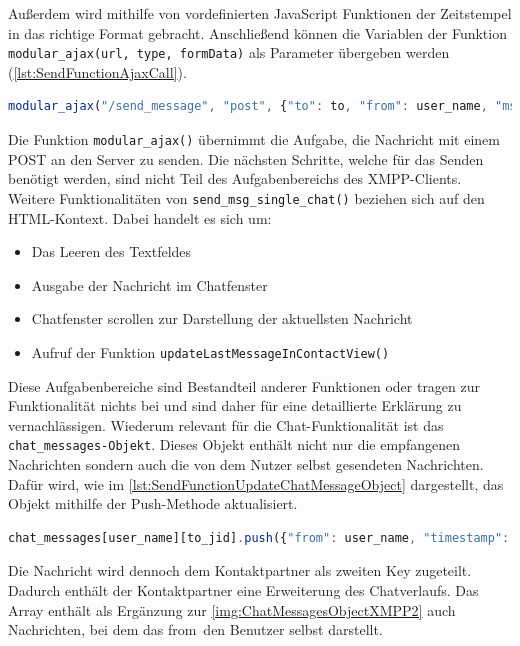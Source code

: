 \documentclass[a4paper,titlepage,halfparskip,12pt]{scrreprt}
\begin{document}
\begin{onehalfspacing}
Außerdem wird mithilfe von vordefinierten JavaScript Funktionen der Zeitstempel in das richtige Format gebracht. Anschließend können die Variablen der Funktion \texttt{modular\_ajax(url, type, formData)} als Parameter übergeben werden (\autoref{lst:SendFunctionAjaxCall}).
\begin{lstlisting}[language=Javascript,caption=Aufruf der Funktion \texttt{modular\_ajax(url, type, formData)} mit allen Parametern  ,label={lst:SendFunctionAjaxCall}]
modular_ajax("/send_message", "post", {"to": to, "from": user_name, "msg_subject": "", "msg_body": msg, "msg_type": "chat"});
\end{lstlisting}
Die Funktion \texttt{modular\_ajax()} übernimmt die Aufgabe, die Nachricht mit einem POST an den Server zu senden. Die nächsten Schritte, welche für das Senden benötigt werden, sind nicht Teil des Aufgabenbereichs des XMPP-Clients.
Weitere Funktionalitäten von \texttt{send\_msg\_single\_chat()} beziehen sich auf den \ac{HTML}-Kontext. Dabei handelt es sich um:
\begin{itemize}
	\item Das Leeren des Textfeldes
	\item Ausgabe der Nachricht im Chatfenster
	\item Chatfenster scrollen zur Darstellung der aktuellsten Nachricht
	\item Aufruf der Funktion \texttt{updateLastMessageInContactView()} 
\end{itemize}
Diese Aufgabenbereiche sind Bestandteil anderer Funktionen oder tragen zur Funktionalität nichts bei und sind daher für eine detaillierte Erklärung zu vernachlässigen. Wiederum relevant für die Chat-Funktionalität ist das \texttt{chat\_messages-Objekt}. Dieses Objekt enthält nicht nur die empfangenen Nachrichten sondern auch die von dem Nutzer selbst gesendeten Nachrichten. Dafür wird, wie im \autoref{lst:SendFunctionUpdateChatMessageObject} dargestellt, das Objekt mithilfe der Push-Methode aktualisiert.
\begin{lstlisting}[language=Javascript,caption=Nachricht in Dictionary einfügen  ,label={lst:SendFunctionUpdateChatMessageObject}]
chat_messages[user_name][to_jid].push({"from": user_name, "timestamp": msg_timestamp, "txt": msg, "type": "chat"});
\end{lstlisting}
Die Nachricht wird dennoch dem Kontaktpartner als zweiten Key zugeteilt. Dadurch enthält der Kontaktpartner eine Erweiterung des Chatverlaufs. Das Array enthält als Ergänzung zur \autoref{img:ChatMessagesObjectXMPP2} auch Nachrichten, bei dem das \glqq from\grqq\ den Benutzer selbst darstellt.

\end{onehalfspacing}
\end{document}
